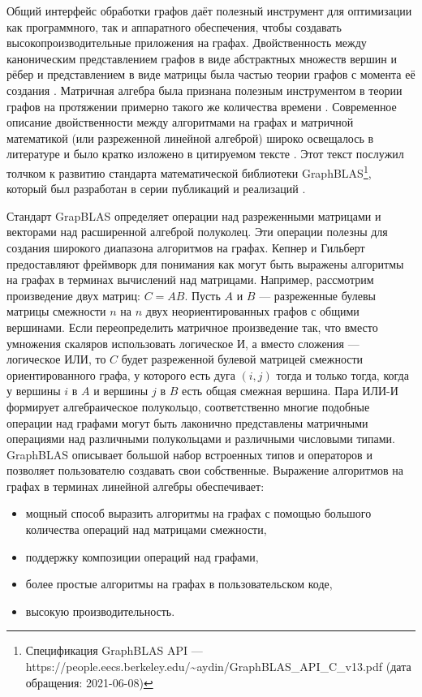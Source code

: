 \documentclass[14pt]{matmex-diploma-custom}
\begin{document}
Общий интерфейс обработки графов даёт полезный инструмент для оптимизации как программного, так и аппаратного обеспечения, чтобы создавать высокопроизводительные приложения на графах. Двойственность между каноническим представлением графов в виде абстрактных множеств вершин и рёбер и представлением в виде матрицы была частью теории графов с момента её создания \cite{Konig}. Матричная алгебра была признана полезным инструментом в теории графов на протяжении примерно такого же количества времени \cite{Harary}. Современное описание двойственности между алгоритмами на графах и матричной математикой (или разреженной линейной алгеброй) широко освещалось в литературе и было кратко изложено в цитируемом тексте \cite{Kepner}. Этот текст послужил толчком к развитию стандарта математической библиотеки GraphBLAS\footnote{Спецификация GraphBLAS API --- https://people.eecs.berkeley.edu/\textasciitilde{}aydin/GraphBLAS\_API\_C\_v13.pdf (дата обращения: 2021-06-08)}, который был разработан в серии публикаций \cite{Mattson} и реализаций \cite{Zhang}.

Стандарт GrapBLAS определяет операции над разреженными матрицами и векторами над расширенной алгеброй полуколец. Эти операции полезны для создания широкого диапазона алгоритмов на графах. Кепнер и Гильберт \cite{Kepner} предоставляют фреймворк для понимания как могут быть выражены алгоритмы на графах в терминах вычислений над матрицами. Например, рассмотрим произведение двух матриц: \(C = AB\). Пусть \(A\) и \(B\) --- разреженные булевы матрицы смежности \(n\) на \(n\) двух неориентированных графов с общими вершинами. Если переопределить матричное произведение так, что вместо умножения скаляров использовать логическое И, а вместо сложения --- логическое ИЛИ, то \(C\) будет разреженной булевой матрицей смежности ориентированного графа, у которого есть дуга \((i, j)\) тогда и только тогда, когда у вершины \(i\) в \(A\) и вершины \(j\) в \(B\) есть общая смежная вершина. Пара ИЛИ-И формирует алгебраическое полукольцо, соответственно многие подобные операции над графами могут быть лаконично представлены матричными операциями над различными полукольцами и различными числовыми типами. GraphBLAS описывает большой набор встроенных типов и операторов и позволяет пользователю создавать свои собственные. Выражение алгоритмов на графах в терминах линейной алгебры обеспечивает:
\begin{itemize}
    \item мощный способ выразить алгоритмы на графах с помощью большого количества операций над матрицами смежности,
    \item поддержку композиции операций над графами,
    \item более простые алгоритмы на графах в пользовательском коде,
    \item высокую производительность.
\end{itemize}
\end{document}
